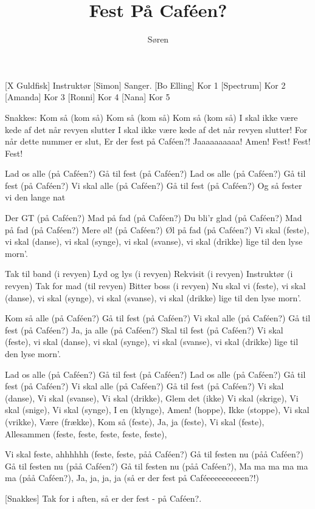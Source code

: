\documentclass[a4paper,11pt]{article}
\title{Fest På Caféen?}
\author{Søren}
\begin{document}
\maketitle

\begin{roles}
  [X Guldfisk] Instruktør
	[Simon] Sanger.
  [Bo Elling] Kor 1
  [Spectrum] Kor 2
  [Amanda] Kor 3
  [Ronni] Kor 4
  [Nana] Kor 5
\end{roles}

\begin{song}

 Snakkes:
Kom så (kom så)
Kom så (kom så)
Kom så (kom så)
I skal ikke være kede af det når revyen slutter
I skal ikke være kede af det når revyen slutter!
For når dette nummer er slut,
Er der fest på Caféen?!
Jaaaaaaaaaa! Amen!
Fest! Fest! Fest!

 Lad os alle (på Caféen?)
Gå til fest (på Caféen?)
Lad os alle (på Caféen?)
Gå til fest (på Caféen?)
Vi skal alle (på Caféen?)
Gå til fest (på Caféen?)
Og så fester vi den lange nat

 Der GT (på Caféen?)
Mad på fad (på Caféen?)
Du bli'r glad (på Caféen?)
Mad på fad (på Caféen?)
Mere øl! (på Caféen?)
Øl på fad (på Caféen?)
Vi skal (feste), vi skal (danse), 
vi skal (synge), vi skal (svanse), 
vi skal (drikke) lige til den lyse morn'.

 Tak til band (i revyen)
Lyd og lys (i revyen)
Rekvisit (i revyen)
Instruktør (i revyen)
Tak for mad (til revyen)
Bitter boss (i revyen)
Nu skal vi (feste), vi skal (danse), 
vi skal (synge), vi skal (svanse), 
vi skal (drikke) lige til den lyse morn'.

 Kom så alle (på Caféen?)
Gå til fest (på Caféen?)
Vi skal alle (på Caféen?)
Gå til fest (på Caféen?)
Ja, ja alle (på Caféen?)
Skal til fest (på Caféen?)
Vi skal (feste), vi skal (danse), 
vi skal (synge), vi skal (svanse), 
vi skal (drikke) lige til den lyse morn'.

 Lad os alle (på Caféen?)
Gå til fest (på Caféen?)
Lad os alle (på Caféen?)
Gå til fest (på Caféen?)
Vi skal alle (på Caféen?)
Gå til fest (på Caféen?)
Vi skal (danse),
Vi skal (svanse),
Vi skal (drikke),
Glem det (ikke)
Vi skal (skrige),
Vi skal (snige),
Vi skal (synge),
I en (klynge),
Amen! (hoppe),
Ikke (stoppe),
Vi skal (vrikke),
Være (frække),
Kom så (feste),
Ja, ja (feste),
Vi skal (feste),
Allesammen (feste, feste, feste, feste, feste),

 Vi skal feste, ahhhhhh (feste, feste, påå Caféen?)
Gå til festen nu (påå Caféen?)
Gå til festen nu (påå Caféen?)
Gå til festen nu (påå Caféen?),
Ma ma ma ma ma ma (påå Caféen?),
Ja, ja, ja, ja (så er der fest på Caféeeeeeeeeeen?!)

[Snakkes] Tak for i aften, så er der fest - på Caféen?.

\end{song}
\end{document}
